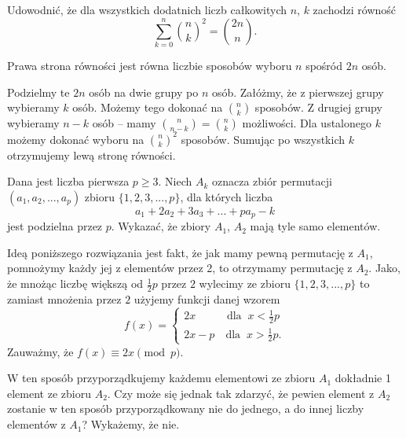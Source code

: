 \newpage

\begin{problem}{3} 
	Udowodnić, że dla wszystkich dodatnich liczb całkowitych $n$, $k$ zachodzi równość
	\[
	    \sum^{n}_{k=0} {{n}\choose{k}}^2 = {{2n}\choose{n}}.
	\]
\end{problem}

\vspace{5px}

\noindent
Prawa strona równości jest równa liczbie sposobów wyboru $n$ spośród $2n$ osób.
\vspace{10px}

\noindent
Podzielmy te $2n$ osób na dwie grupy po $n$ osób. Załóżmy, że z pierwszej grupy wybieramy $k$ osób. Możemy tego dokonać na ${n}\choose{k}$ sposobów. Z drugiej grupy wybieramy $n - k$ osób -- mamy ${{n}\choose{n - k}} = {{n}\choose{k}}$ możliwości. Dla ustalonego $k$ możemy dokonać wyboru na ${{n}\choose{k}}^2$ sposobów. Sumując po wszystkich $k$ otrzymujemy lewą stronę równości.

\begin{problem}{4}
	Dana jest liczba pierwsza $p \geqslant 3$. Niech $A_k$ oznacza zbiór permutacji $(a_1, a_2, ..., a_p)$ zbioru $\{1, 2, 3,..., p\}$, dla których liczba
	\[
		a_1 + 2a_2 + 3a_3 + ... + pa_p - k
	\]
	jest podzielna przez $p$. Wykazać, że zbiory $A_1$, $A_2$ mają tyle samo elementów.
\end{problem}

\vspace{5px}

\noindent
Ideą poniższego rozwiązania jest fakt, że jak mamy pewną permutację z $A_1$, pomnożymy każdy jej z elementów przez 2, to otrzymamy permutację z $A_2$. Jako, że mnożąc liczbę większą od $\frac{1}{2}p$ przez $2$ wylecimy ze zbioru $\{1, 2, 3,..., p\}$ to zamiast mnożenia przez $2$ użyjemy funkcji danej wzorem
\[
	f(x) = 
	\begin{cases}
	2x \;\;\; \quad\quad\text{dla} \;\; x < \frac{1}{2}p\\
	2x - p \quad \text{dla} \;\; x > \frac{1}{2}p.
	\end{cases}
\]
Zauważmy, że $f(x) \equiv 2x \pmod{p}$.
\vspace{10px}

\noindent
W ten sposób przyporządkujemy każdemu elementowi ze zbioru $A_1$ dokładnie 1 element ze zbioru $A_2$. Czy może się jednak tak zdarzyć, że pewien element z $A_2$ zostanie w ten sposób przyporządkowany nie do jednego, a do innej liczby elementów z $A_1$? Wykażemy, że nie.
\vspace{10px}

